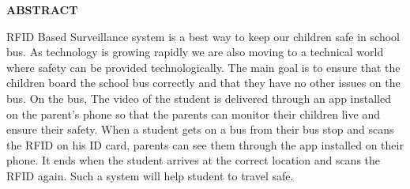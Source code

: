 




\begin{center}
\textbf{\LARGE{ABSTRACT}}\\[1cm]

\end{center}
\normalsize
RFID Based Surveillance system is a best way to keep our children safe in school bus. As technology is growing rapidly we are also
moving to a technical world where safety can be provided technologically. The main goal is to ensure that the children board the school bus correctly and that they have no other issues on the bus. On the bus,
The video of the student is delivered through an app installed on the parent's phone so that the parents can monitor their children live and ensure their safety. When a student gets on a bus from their bus stop and scans the RFID on his ID card, parents can see them through the app installed on their phone. It ends when the student arrives at the correct location and scans the RFID again. Such a system will help student to travel safe.




